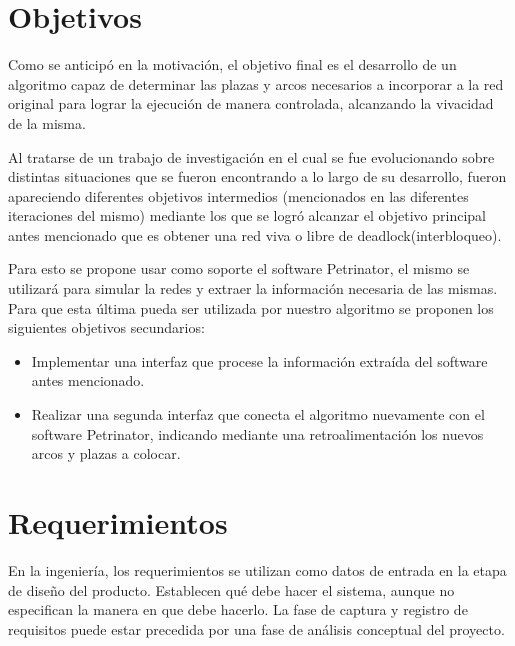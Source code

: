 \section{Objetivos}
Como se anticipó en la motivación, el objetivo final es el desarrollo de un algoritmo capaz de determinar las plazas y arcos necesarios a incorporar a la red original para lograr la ejecución de manera controlada, alcanzando la vivacidad de la misma. 

Al tratarse de un trabajo de investigación en el cual se fue evolucionando sobre distintas situaciones que se fueron encontrando a lo largo de su desarrollo, fueron apareciendo diferentes objetivos intermedios (mencionados en las diferentes iteraciones del mismo) mediante los que se logró alcanzar el objetivo principal antes mencionado que es obtener una red viva o libre de deadlock(interbloqueo).

\bigskip

Para esto se propone usar como soporte el software Petrinator, el mismo se utilizará para simular la redes y extraer la información necesaria de las mismas. Para que esta última pueda ser utilizada por nuestro algoritmo se proponen los siguientes objetivos secundarios:

\begin{itemize}
    \item Implementar una interfaz que procese la información extraída del software antes mencionado.
    
    \item Realizar una segunda interfaz que conecta el algoritmo nuevamente con el software Petrinator, indicando mediante una retroalimentación los nuevos arcos y plazas a colocar.
\end{itemize}

\section{Requerimientos}
En la ingeniería, los requerimientos se utilizan como datos de entrada en la etapa de diseño del producto. Establecen qué debe hacer el sistema, aunque no especifican la manera en que debe hacerlo. La fase de captura y registro de requisitos puede estar precedida por una fase de análisis conceptual del proyecto. 
\bigskip

